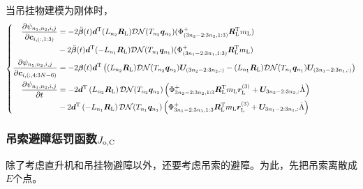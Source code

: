 当吊挂物建模为刚体时，
\begin{equation}\label{J_o_d_partial_3}
    \left\{\begin{aligned}
        \frac{\partial \psi_{n_1, n_2,i,j}}{\partial \boldsymbol{c}_{i,(:,1:3)}} &= -2 \ddot{\boldsymbol{\beta}}(t) \boldsymbol{d}^{\rm{T}} 
            (L_{n_2}\boldsymbol{R}_{\rm{L}}) \mathcal{DN}(T_{n_2}\boldsymbol{q}_{n_2}) (\Phi^{+}_{(3n_2-2:3n_2,1:3)}\boldsymbol{R}{\rm{_L^T}}m_{\rm{L}}) \\
            &-2 \ddot{\boldsymbol{\beta}}(t) \boldsymbol{d}^{\rm{T}} (-L_{n_1}\boldsymbol{R}_{\rm{L}}) \mathcal{DN}(T_{n_1}\boldsymbol{q}_{n_1}) (\Phi^{+}_{(3n_1-2:3n_1,1:3)}\boldsymbol{R}{\rm{_L^T}}m_{\rm{L}})
        \\
        \frac{\partial \psi_{n_1, n_2,i,j}}{\partial \boldsymbol{c}_{i,(:,4:3N-6)}} &= -2\boldsymbol{\beta}(t)\boldsymbol{d}^{\rm{T}} \left(
            (L_{n_2}\boldsymbol{R}_{\rm{L}}) \mathcal{DN}(T_{n_2}\boldsymbol{q}_{n_2})\boldsymbol{U}_{(3n_2-2:3n_2, :)} -
            (L_{n_1}\boldsymbol{R}_{\rm{L}}) \mathcal{DN}(T_{n_1}\boldsymbol{q}_{n_1})\boldsymbol{U}_{(3n_1-2:3n_1, :)}
        \right)\\
        \frac{\partial \psi_{n_1, n_2,i,j}}{\partial t} &= -2\boldsymbol{d}^{\rm{T}}
            \left(L_{n_2}\boldsymbol{R}_{\rm{L}}\right)\mathcal{DN}(T_{n_2}\boldsymbol{q}_{n_2})\left(
                \Phi^{+}_{3n_2-2:3n_2, 1:3}\boldsymbol{R}{\rm{_L^T}}m_{\rm{L}}\boldsymbol{r}_{\rm{L}}^{(3)} + \boldsymbol{U}_{3n_2-2:3n_2, :} \dot{\Lambda}
            \right)\\
             & -2\boldsymbol{d}^{\rm{T}}\left(-L_{n_1}\boldsymbol{R}_{\rm{L}}\right)\mathcal{DN}(T_{n_1}\boldsymbol{q}_{n_1})\left(
                \Phi^{+}_{3n_1-2:3n_1, 1:3}\boldsymbol{R}{\rm{_L^T}}m_{\rm{L}}\boldsymbol{r}_{\rm{L}}^{(3)} + \boldsymbol{U}_{3n_1-2:3n_1,:} \dot{\Lambda}
            \right)
    \end{aligned}
    \right.
\end{equation}

\subsubsection{吊索避障惩罚函数$J_{\rm{o,C}}$}
除了考虑直升机和吊挂物避障以外，还要考虑吊索的避障。为此，先把吊索离散成$E$个点。


